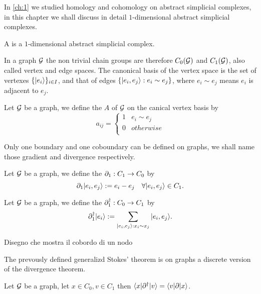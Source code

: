 \documentclass[../2.tex]{subfiles}
\begin{document}
    In \autoref{ch:1} we studied homology and cohomology on abstract simplicial complexes, in this chapter we shall discuss in detail
    $1$-dimensional abstract simplicial complexes.

    \begin{defn}
        A  is a $1$-dimensional abstract simplicial complex.
    \end{defn}

    In a graph $\mathcal{G}$ the non trivial chain groups are therefore $C_0(\mathcal{G})$ and $C_1(\mathcal{G})$, also called vertex and edge spaces. 
    The canonical basis of the vertex space is the set of vertexes $\{| e_i \rangle\}_{i \in I}$, and that of edges $\{| e_i,e_j \rangle : e_i \sim e_j\}$, where $e_i \sim e_j$ means $e_i$ is adjacent to $e_j$.

    \begin{defn}
        Let $\mathcal{G}$ be a graph, we define the  $A$ of $\mathcal{G}$ on the canical vertex basis by
        \[a_{ij} = 
        \begin{cases}
            1 & e_i \sim e_j \\
            0 & otherwise \\
        \end{cases} \]        
    \end{defn}
    Only one boundary and one coboundary can be defined on graphs, we shall name those gradient and divergence respectively.

    \begin{defn}
        Let $\mathcal{G}$ be a graph, we define the  $\partial_1 : C_1 \to C_0$ by 
        \[ \partial_1| e_i,e_j \rangle := e_i - e_j \quad \forall | e_i,e_j \rangle \in C_1.\]
    \end{defn}
    
    \begin{defn}
        Let $\mathcal{G}$ be a graph, we define the  $\partial^\dagger_1 : C_0 \to C_1$ by 
        \[ \partial^\dagger_1| e_i \rangle := \sum_{| e_i,e_j \rangle : x_i \sim x_j} | e_i,e_j \rangle.\]
    \end{defn}

    {\color{red} Disegno che mostra il cobordo di un nodo}

    The prevously defined generalizd Stokes' theorem is on graphs a discrete version of the divergence theorem.

    \begin{thm}
        Let $\mathcal{G}$ be a graph, let $x \in C_0, v \in C_1$ then $\langle x |\partial^\dagger| v \rangle = \langle v |\partial| x \rangle$.
    \end{thm}
\end{document}
